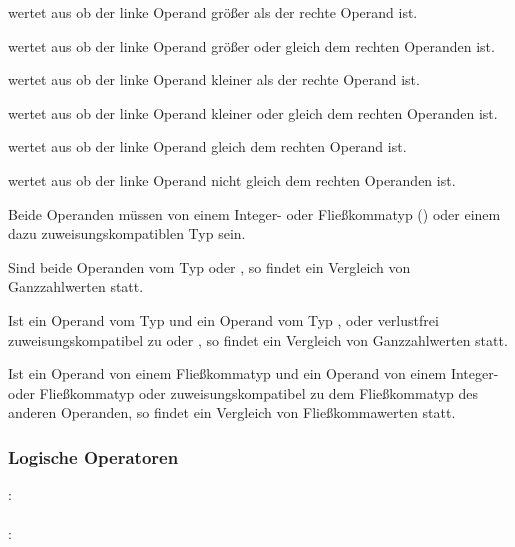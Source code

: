 \op{>} wertet aus ob der linke Operand größer als der rechte Operand ist.

\op{>=} wertet aus ob der linke Operand größer oder gleich dem rechten Operanden ist.

\op{<} wertet aus ob der linke Operand kleiner als der rechte Operand ist.

\op{<=} wertet aus ob der linke Operand kleiner oder gleich dem rechten Operanden ist.

\op{==} wertet aus ob der linke Operand gleich dem rechten Operand ist.

\op{!=} wertet aus ob der linke Operand nicht gleich dem rechten Operanden ist.

Beide Operanden müssen von einem Integer- oder Fließkommatyp () oder einem
dazu zuweisungskompatiblen Typ sein.

Sind beide Operanden vom Typ  oder , so findet ein Vergleich von Ganzzahlwerten statt.

Ist ein Operand vom Typ  und ein Operand vom Typ ,  oder
verlustfrei zuweisungskompatibel zu  oder , so findet ein Vergleich von Ganzzahlwerten statt.

Ist ein Operand von einem Fließkommatyp und ein Operand von einem Integer- oder Fließkommatyp
oder zuweisungskompatibel zu dem Fließkommatyp des anderen Operanden,
so findet ein Vergleich von Fließkommawerten statt.


\subsubsection{Logische Operatoren}\label{Logische Operatoren}
:\label{asdr_logisch_oder}\\
\hspace*{1cm} \Gspace{}\\
:\label{asdr_logisch_und}\\
\hspace*{1cm} \Gspace{}\\

